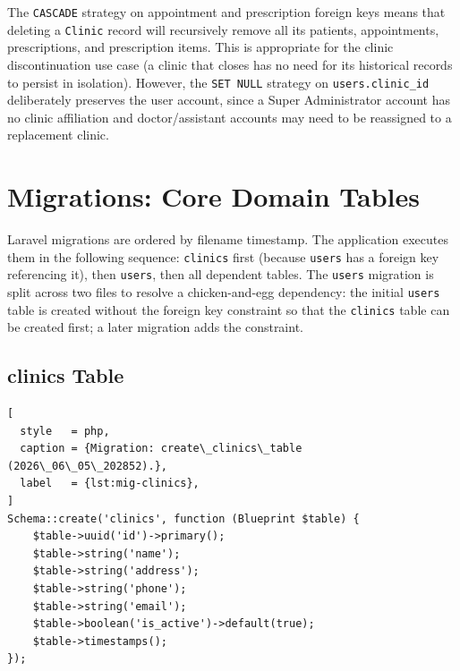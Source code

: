 \begin{notebox}
  The \texttt{CASCADE} strategy on appointment and prescription foreign
  keys means that deleting a \texttt{Clinic} record will recursively
  remove all its patients, appointments, prescriptions, and prescription
  items. This is appropriate for the clinic discontinuation use case
  (a clinic that closes has no need for its historical records to persist
  in isolation). However, the \texttt{SET NULL} strategy on
  \texttt{users.clinic\_id} deliberately preserves the user account,
  since a Super Administrator account has no clinic affiliation and
  doctor/assistant accounts may need to be reassigned to a replacement
  clinic.
\end{notebox}

\section{Migrations: Core Domain Tables}
\label{sec:migrations}

Laravel migrations are ordered by filename timestamp. The application
executes them in the following sequence: \texttt{clinics} first (because
\texttt{users} has a foreign key referencing it), then \texttt{users},
then all dependent tables. The \texttt{users} migration is split across
two files to resolve a chicken-and-egg dependency: the initial
\texttt{users} table is created without the foreign key constraint so
that the \texttt{clinics} table can be created first; a later migration
adds the constraint.

\subsection{clinics Table}

\begin{lstlisting}[
  style   = php,
  caption = {Migration: create\_clinics\_table (2026\_06\_05\_202852).},
  label   = {lst:mig-clinics},
]
Schema::create('clinics', function (Blueprint $table) {
    $table->uuid('id')->primary();
    $table->string('name');
    $table->string('address');
    $table->string('phone');
    $table->string('email');
    $table->boolean('is_active')->default(true);
    $table->timestamps();
});
\end{lstlisting}


